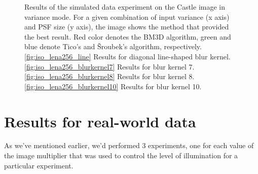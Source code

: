 \documentclass[12pt,notitlepage]{report}
\begin{document}
\begin{figure}[htb]
  \caption[Results for the castle image in variance mode]{Results of the simulated data experiment on the Castle image in variance mode. For a given combination of input variance (x axis) and PSF size (y axis), the image shows the method that provided the best result. Red color denotes the BM3D algorithm, green and blue denote Tico's and Šroubek's algorithm, respectively. \ref{fig:iso_lena256_line} Results for diagonal line-shaped blur kernel. \ref{fig:iso_lena256_blurkernel7} Results for blur kernel 7. \ref{fig:iso_lena256_blurkernel8} Results for blur kernel 8. \ref{fig:iso_lena256_blurkernel10} Results for blur kernel 10.} 
  \label{fig:var_castle256}
\end{figure}

\clearpage

\section{Results for real-world data}
\label{sec:real_world_data}

As we've mentioned earlier, we'd performed 3 experiments, one for each value of the image multiplier that was used to control the level of illumination for a particular experiment.   
\end{document}
